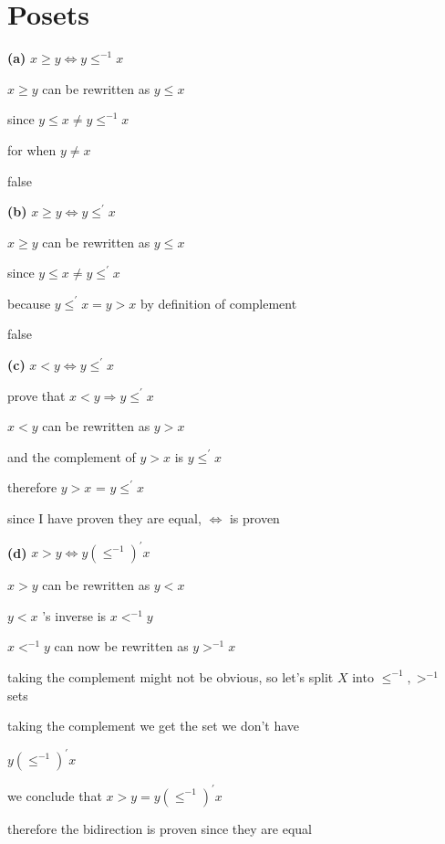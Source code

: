\documentclass[12pts,A4]{article}
\begin{document}
\section{Posets}
\begin{flushleft}


\textbf{(a)} $ x \geq y \iff y \leq^{-1} x $ 

    $ x \geq y $ can be rewritten as
    $ y \leq x $

    since $y \leq x \not = y \leq^{-1} x$

    for when $y \not = x$

    false
    \bigskip

\textbf{(b)} $ x \geq y \iff y \leq^{'} x $ 

    $ x \geq y $ can be rewritten as
    $ y \leq x $

    since $y \leq x \not = y \leq^{'} x$
    
    because $y \leq^{'} x = y > x $ by definition of complement

    false

    \bigskip


\textbf{(c)} $ x < y \iff y \leq^{'} x $ 

    prove that $ x < y \Rightarrow y \leq^{'} x $  

    $x <  y$ can be rewritten as $ y >  x$

    and the complement of $ y > x$ is $ y \leq ^{'} x$ 
    
    therefore $y>x$ = $y \leq ^{'} x$
    \bigskip

    since I have proven they are equal, $\iff$ is proven

\textbf{(d)} $ x > y \iff y (\leq^{-1})^{'} x $ 

    $ x > y $ can be rewritten as $ y < x$

    $ y < x $ 's inverse is $ x < ^{-1} y $

    $ x < ^{-1} y $ can now be rewritten as $y > ^{-1} x$

    taking the complement might not be obvious, so let's split
    $X$ into $ \leq^{-1} ,>^{-1} $ sets
   
    taking the complement we get the set we don't have
    
    $y (\leq ^{-1})^{'} x$
    
    
    \bigskip

    we conclude that $ x > y =  y (\leq^{-1})^{'} x $  

    therefore the bidirection is proven since they are equal
    

\end{flushleft}
\end{document}
